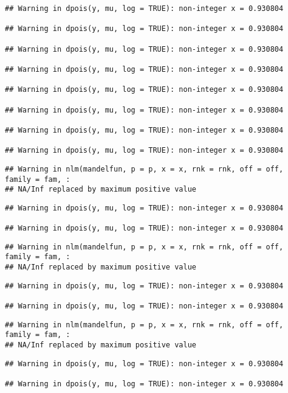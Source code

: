 \documentclass[
]{article}
\begin{document}
\begin{verbatim}
## Warning in dpois(y, mu, log = TRUE): non-integer x = 0.930804

## Warning in dpois(y, mu, log = TRUE): non-integer x = 0.930804

## Warning in dpois(y, mu, log = TRUE): non-integer x = 0.930804

## Warning in dpois(y, mu, log = TRUE): non-integer x = 0.930804

## Warning in dpois(y, mu, log = TRUE): non-integer x = 0.930804

## Warning in dpois(y, mu, log = TRUE): non-integer x = 0.930804

## Warning in dpois(y, mu, log = TRUE): non-integer x = 0.930804

## Warning in dpois(y, mu, log = TRUE): non-integer x = 0.930804
\end{verbatim}

\begin{verbatim}
## Warning in nlm(mandelfun, p = p, x = x, rnk = rnk, off = off, family = fam, :
## NA/Inf replaced by maximum positive value
\end{verbatim}

\begin{verbatim}
## Warning in dpois(y, mu, log = TRUE): non-integer x = 0.930804

## Warning in dpois(y, mu, log = TRUE): non-integer x = 0.930804
\end{verbatim}

\begin{verbatim}
## Warning in nlm(mandelfun, p = p, x = x, rnk = rnk, off = off, family = fam, :
## NA/Inf replaced by maximum positive value
\end{verbatim}

\begin{verbatim}
## Warning in dpois(y, mu, log = TRUE): non-integer x = 0.930804

## Warning in dpois(y, mu, log = TRUE): non-integer x = 0.930804
\end{verbatim}

\begin{verbatim}
## Warning in nlm(mandelfun, p = p, x = x, rnk = rnk, off = off, family = fam, :
## NA/Inf replaced by maximum positive value
\end{verbatim}

\begin{verbatim}
## Warning in dpois(y, mu, log = TRUE): non-integer x = 0.930804

## Warning in dpois(y, mu, log = TRUE): non-integer x = 0.930804
\end{verbatim}
\end{document}

